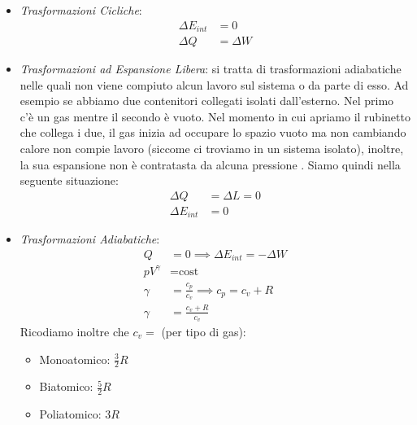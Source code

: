 \begin{itemize}
                \item \textit{Trasformazioni Cicliche}:
                    \begin{align*}
                        \Delta E_{int} &= 0 \\ 
                        \Delta Q &= \Delta W
                    \end{align*}
                \item \textit{Trasformazioni ad Espansione Libera}: si tratta 
                        di trasformazioni adiabatiche nelle quali non viene 
                        compiuto alcun lavoro sul sistema o da parte di esso.
                        Ad esempio se abbiamo due contenitori collegati isolati 
                        dall'esterno. Nel primo c'è un gas mentre il secondo è
                        vuoto. Nel momento in cui apriamo il rubinetto che 
                        collega i due, il gas inizia ad occupare lo spazio 
                        vuoto ma non cambiando calore non compie lavoro 
                        (siccome ci troviamo in un sistema isolato), inoltre,
                        la sua espansione non è contratasta da alcuna pressione
                        . Siamo quindi nella seguente situazione:
                        \begin{align*}
                            \Delta Q &= \Delta L = 0 \\
                            \Delta E_{int} &= 0
                        \end{align*}
                        
                \item \textit{Trasformazioni Adiabatiche}: 
                        \begin{align*}
                            Q &=0 \implies \Delta E_{int} = -\Delta W \\
                        pV^\gamma &= \text{cost} \\
                        \gamma &= \frac{c_p}{c_v} \implies c_p = c_v + R \\
                        \gamma &= \frac{c_v + R}{c_v}
                        \end{align*}
                        Ricodiamo inoltre che $c_v = $ (per tipo di gas):
                        \begin{itemize}
                            \item Monoatomico: $\frac{3}{2} R$
                            \item Biatomico: $\frac{5}{2} R$
                            \item Poliatomico: $3 R$
                        \end{itemize}
            \end{itemize}

